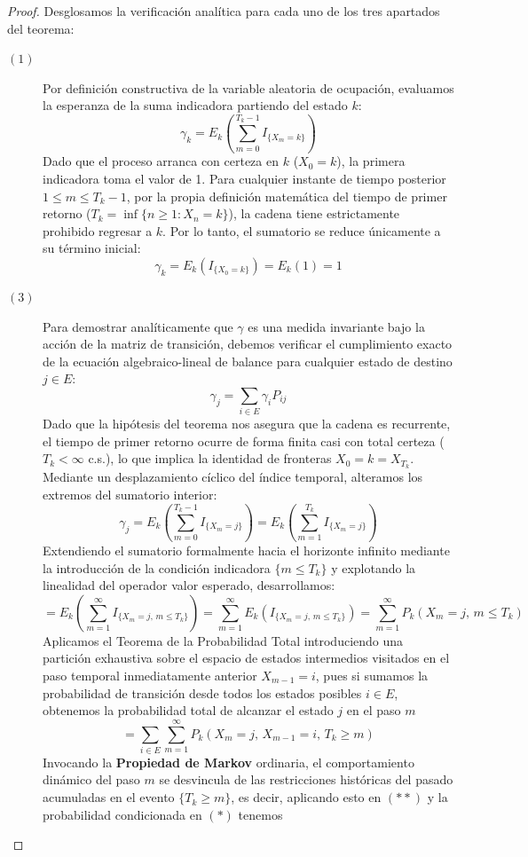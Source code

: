 \begin{teo}
\begin{proof}
    Desglosamos la verificación analítica para cada uno de los tres apartados del teorema:
    \begin{description}
        \item[$(1)$] Por definición constructiva de la variable aleatoria de ocupación, evaluamos la esperanza de la suma indicadora partiendo del estado $k$:
            \[ 
            \gamma_k = E_k \left( \sum_{m=0}^{T_k - 1} I_{\{X_m = k\}} \right) 
            \]
            Dado que el proceso arranca con certeza en $k$ ($X_0 = k$), la primera indicadora toma el valor de 1. Para cualquier instante de tiempo posterior $1 \leq m \leq T_k - 1$, por la propia definición matemática del tiempo de primer retorno ($T_k = \inf\{n \geq 1 : X_n = k\}$), la cadena tiene estrictamente prohibido regresar a $k$. Por lo tanto, el sumatorio se reduce únicamente a su término inicial:
            \[
            \gamma_k = E_k(I_{\{X_0 = k\}}) = E_k(1) = 1
            \]
        \item[$(3)$] Para demostrar analíticamente que $\gamma$ es una medida invariante bajo la acción de la matriz de transición, debemos verificar el cumplimiento exacto de la ecuación algebraico-lineal de balance para cualquier estado de destino $j \in E$:
            \[
            \gamma_j = \sum_{i \in E} \gamma_i P_{ij}
            \]
            Dado que la hipótesis del teorema nos asegura que la cadena es recurrente, el tiempo de primer retorno ocurre de forma finita casi con total certeza ($T_k < \infty$ c.s.), lo que implica la identidad de fronteras $X_0 = k = X_{T_k}$. Mediante un desplazamiento cíclico del índice temporal, alteramos los extremos del sumatorio interior:
            \[
            \gamma_j = E_k \left( \sum_{m=0}^{T_k - 1} I_{\{X_m = j\}} \right) 
            = E_k \left( \sum_{m=1}^{T_k} I_{\{X_m = j\}} \right) 
            \]
            Extendiendo el sumatorio formalmente hacia el horizonte infinito mediante la introducción de la condición indicadora $\{m \leq T_k\}$ y explotando la linealidad del operador valor esperado, desarrollamos:
            \[
            = E_k \left( \sum_{m=1}^{\infty} I_{\{X_m = j, \, m \leq T_k\}} \right) 
            = \sum_{m=1}^{\infty} E_k \left( I_{\{X_m = j, \, m \leq T_k\}} \right) 
            = \sum_{m=1}^{\infty} P_k (X_m = j, \, m \leq T_k)
            \]
            Aplicamos el Teorema de la Probabilidad Total introduciendo una partición exhaustiva sobre el espacio de estados intermedios visitados en el paso temporal inmediatamente anterior $X_{m-1} = i$, pues si sumamos la probabilidad de transición desde todos los estados posibles $i \in E$, obtenemos la probabilidad total de alcanzar el estado $j$ en el paso $m$
            \[
            = \sum_{i \in E} \sum_{m=1}^{\infty} P_k (X_m = j, \, X_{m-1} = i, \, T_k \geq m)
            \]
            Invocando la \textbf{Propiedad de Markov} ordinaria, el comportamiento dinámico del paso $m$ se desvincula de las restricciones históricas del pasado acumuladas en el evento $\{T_k \geq m\}$, es decir, aplicando esto en $(**)$ y la probabilidad condicionada en $(*)$ tenemos


\end{description}
\end{proof}
\end{teo}
